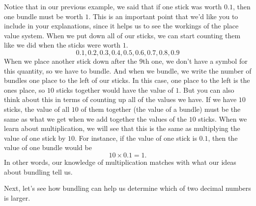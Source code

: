 \documentclass{ximera}
\begin{document}
Notice that in our previous example, we said that if one stick was worth $0.1$, then one bundle must be worth $1$. This is an important point that we'd like you to include in your explanations, since it helps us to see the workings of the place value system. When we put down all of our sticks, we can start counting them like we did when the sticks were worth $1$.
\[
0.1, 0.2, 0.3, 0.4, 0.5, 0.6, 0.7, 0.8, 0.9
\]
When we place another stick down after the $9$th one, we don't have a symbol for this quantity, so we have to bundle. And when we bundle, we write the number of bundles one place to the left of our sticks. In this case, one place to the left is the ones place, so $10$ sticks together would have the value of $1$. But you can also think about this in terms of counting up all of the values we have. If we have $10$ sticks, the value of all $10$ of them together (the value of a bundle) must be the same as what we get when we  add together the values of the $10$ sticks. When we learn about multiplication, we will see that this is the same as multiplying the value of one stick by $10$. For instance, if the value of one stick is $0.1$, then the value of one bundle would be 
\[
10 \times 0.1 = 1.
\]
In other words, our knowledge of multiplication matches with what our ideas about bundling tell us.

Next, let's see how bundling can help us determine which of two decimal numbers is larger.
\end{document}

